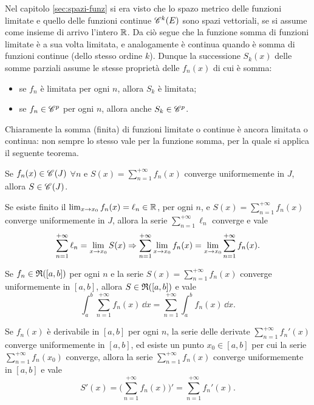 Nel capitolo \ref{sec:spazi-funz} si era visto che lo spazo metrico delle funzioni limitate e quello delle funzioni continue $\cont[k]{E}$ sono spazi vettoriali, se si assume come insieme di arrivo l'intero $\R$. Da ciò segue che la funzione somma di funzioni limitate è a sua volta limitata, e analogamente è continua quando è somma di funzioni continue (dello stesso ordine $k$). Dunque la successione $S_k(x)$ delle somme parziali assume le stesse proprietà delle $f_n(x)$ di cui è somma:
\begin{itemize}
\item se $f_n$ è limitata per ogni $n$, allora $S_k$ è limitata;
\item se $f_n\in\cclass[p]$ per ogni $n$, allora anche $S_k\in\cclass[p]$.
\end{itemize}
Chiaramente la somma (finita) di funzioni limitate o continue è ancora limitata o continua: non sempre lo stesso vale per la funzione somma, per la quale si applica il seguente teorema.
\begin{teorema}
	Se $f_n(x)\in\cont{J}$ $\forall n$ e $S(x)=\sum_{n=1}^{+\infty}f_n(x)$ converge uniformemente in $J$, allora $S\in\cont{J}$.
\end{teorema}
\begin{teorema} \label{t:continuita_serie_conv_uniforme}
Se esiste finito il $\lim_{x\to x_0}f_n(x)=\ell_n\in\R$, per ogni $n$, e $S(x)=\sum_{n=1}^{+\infty}f_n(x)$ converge uniformemente in $J$, allora la serie $\sum_{n=1}^{+\infty}\ell_n$ converge e vale
\[
\sum_{n=1}^{+\infty}\ell_n=\lim_{x\to x_0}S(x)\then\sum_{n=1}^{+\infty}\lim_{x\to x_0}f_n(x)=\lim_{x\to x_0}\sum_{n=1}^{+\infty}f_n(x).
\]
\end{teorema}
\begin{teorema} \label{t:scambio_integrale_serie}
Se $f_n\in\rie{[a,b]}$ per ogni $n$ e la serie $S(x)=\sum_{n=1}^{+\infty}f_n(x)$ converge uniformemente in $[a,b]$, allora $S\in\rie{[a,b]}$ e vale
\[
\int_a^b\sum_{n=1}^{+\infty}f_n(x)\,\dd x=\sum_{n=1}^{+\infty}\int_a^bf_n(x)\,\dd x.
\]
\end{teorema}
\begin{teorema} \label{t:scambio_derivata_serie}
Se $f_n(x)$ è derivabile in $[a,b]$ per ogni $n$, la serie delle derivate $\sum_{n=1}^{+\infty}f_n'(x)$ converge uniformemente in $[a,b]$, ed esiste un punto $x_0\in[a,b]$ per cui la serie $\sum_{n=1}^{+\infty}f_n(x_0)$ converge, allora la serie $\sum_{n=1}^{+\infty}f_n(x)$ converge uniformemente in $[a,b]$ e vale
\[
S'(x)=\bigg(\sum_{n=1}^{+\infty}f_n(x)\bigg)'=\sum_{n=1}^{+\infty}f_n'(x).
\]
\end{teorema}

